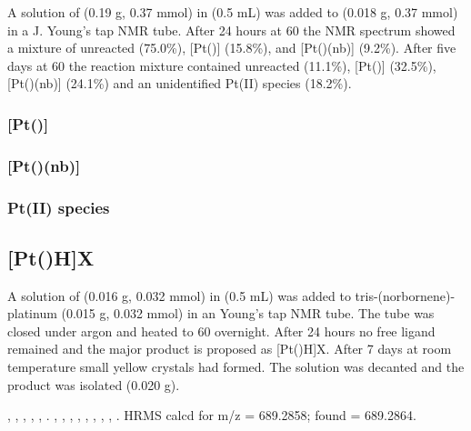 A solution of \tBusixantphos{} (0.19 g, 0.37 mmol) in  (0.5 mL) was added to \ce{[Pt(nb)3]} (0.018 g, 0.37 mmol) in a J. Young's tap NMR tube.  After 24 hours at 60\degC{} the \phosphorus{} NMR spectrum showed a mixture of unreacted \tBusixantphos{} (75.0\%), [Pt(\tBusixantphos)] (15.8\%), and [Pt(\tBusixantphos)(nb)] (9.2\%).  After five days at 60\degC{} the reaction mixture contained unreacted \tBusixantphos{} (11.1\%), [Pt(\tBusixantphos)] (32.5\%), [Pt(\tBusixantphos)(nb)] (24.1\%) and an unidentified Pt(II) species (18.2\%).  

\subsubsection*{[Pt(\tBusixantphos)]}


\subsubsection*{[Pt(\tBusixantphos)(nb)]}


\subsubsection*{Pt(II) \tBusixantphos{} species}


\subsection*{[Pt(\tBuxantphos)H]X}


A solution of \tBuxantphos{} (0.016 g, 0.032 mmol) in  (0.5 mL) was added to tris-(norbornene)-platinum (0.015 g, 0.032 mmol) in an Young's tap NMR tube.  The tube was closed under argon and heated to 60 \degC{} overnight.  After 24 hours no free ligand remained and the major product is proposed as [Pt(\tBuxantphosk)H]X.  After 7 days at room temperature small yellow crystals had formed.  The solution was decanted and the product was isolated (0.020 g).  

\begin{sloppypar}
,
,
,
,
,
.
,
,
,
,
,
,
,
,
.
HRMS calcd for  \ce{[M-X]+} m/z = 689.2858; found = 689.2864.
\end{sloppypar}

